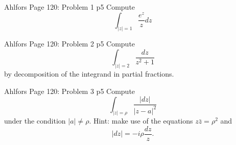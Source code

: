 \documentclass[a4paper, 11pt]{article}
\begin{document}
	\solve{
	
	}

	
	
	\begin{problem}{%
			Ahlfors Page 120: Problem 1
		}{p5%
		}
	Compute
	$$
	\int_{|z|=1} \frac{e^z}{z} d z
	$$
	\end{problem}
	
	\begin{problem}{%
			Ahlfors Page 120: Problem 2
		}{p5%
		}
		Compute
		$$
		\int_{|z|=2} \frac{d z}{z^2+1}
		$$
		by decomposition of the integrand in partial fractions.

	\end{problem}
	
		
	
	\begin{problem}{%
			Ahlfors Page 120: Problem 3
				}{p5%
		}
	Compute
	$$
	\int_{|z|=\rho} \frac{|d z|}{|z-a|^2}
	$$
	under the condition $|a| \neq \rho$. Hint: make use of the equations $z \bar{z}=\rho^2$ and
	$$
	|d z|=-i \rho \frac{d z}{z} .
	$$
		
	\end{problem}
	
\end{document}
